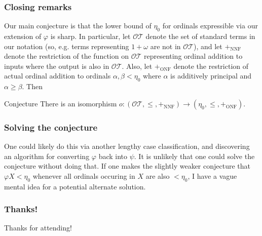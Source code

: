\documentclass{beamer}
\begin{document}
\begin{frame}
\frametitle{Closing remarks}
Our main conjecture is that the lower bound of $\eta_0$ for ordinals expressible via our extension of $\varphi$ is sharp. In particular, let $\mathcal{OT}$ denote the set of standard terms in our notation (so, e.g. terms representing $1 + \omega$ are not in $\mathcal{OT}$), and let $+_{\mathrm{NNF}}$ denote the restriction of the function on $\mathcal{OT}$ representing ordinal addition to inputs where the output is also in $\mathcal{OT}$. \pause Also, let $+_{\mathrm{ONF}}$ denote the restriction of actual ordinal addition to ordinals $\alpha, \beta < \eta_0$ where $\alpha$ is additively principal and $\alpha \geq \beta$. Then

\begin{block}{Conjecture}
There is an isomorphism $o: (\mathcal{OT}, \leq, +_{\mathrm{NNF}}) \longrightarrow (\eta_0, \leq, +_{\mathrm{ONF}})$.
\end{block}
\end{frame}

\begin{frame}
\frametitle{Solving the conjecture}
One could likely do this via another lengthy case classification, and discovering an algorithm for converting $\varphi$ back into $\psi$. It is unlikely that one could solve the conjecture without doing that. \pause If one makes the slightly weaker conjecture that $\varphi X < \eta_0$ whenever all ordinals occuring in $X$ are also $< \eta_0$, I have a vague mental idea for a potential alternate solution.
\end{frame}

\begin{frame}
\frametitle{Thanks!}
Thanks for attending!
\end{frame}
\end{document}
